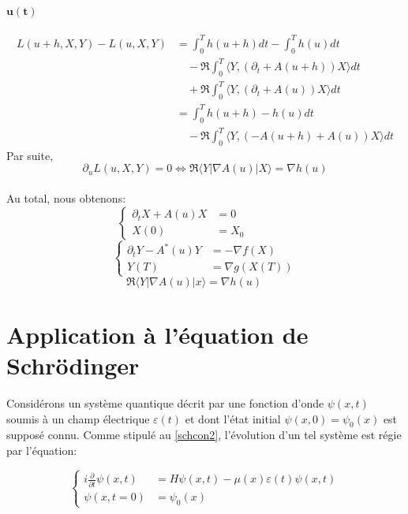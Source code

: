 \paragraph*{$\mathbf{u(t)}$}
\begin{align*}
L(u+h,X,Y) - L(u,X,Y) &= \int_{0}^{T}h(u+h)dt - \int_{0}^{T}h(u)dt\\
&\quad -\Re \int_{0}^{T}\langle Y,(\partial_{t}+A(u+h))X \rangle dt\\
&\quad +\Re \int_{0}^{T}\langle Y,(\partial_{t}+A(u))X \rangle dt\\
&= \int_{0}^{T}h(u+h)-h(u)dt\\
&\quad -\Re \int_{0}^{T}\langle Y,(-A(u+h)+A(u))X \rangle dt
\end{align*}
Par suite, 
\begin{equation}
\partial_{u} L(u,X,Y)=0 \iff \Re \langle Y|\nabla A(u)|X \rangle = \nabla h(u)
\end{equation}
\\Au total, nous obtenons:
\begin{equation}
\begin{cases}
\partial_{t}X +A(u)X &= 0\\
X(0) &=X_0\quad\quad\quad\quad
\end{cases}
\end{equation}
\begin{equation}
\begin{cases}
\partial_{t}Y -A^{*}(u)Y &= -\nabla f(X)\\
Y(T) &=\nabla g(X(T))
\end{cases}
\end{equation}
\begin{equation}
\Re \langle Y|\nabla A(u)|x \rangle = \nabla h(u) \quad\quad
\end{equation}
\section{Application à l'équation de Schrödinger}

Considérons un système quantique décrit par une fonction d’onde $\psi(x, t)$ soumis à un champ électrique $\varepsilon(t)$ et dont l’état initial $\psi(x, 0) = \psi_0 (x)$ est supposé connu. Comme stipulé au \eqref{schcon2}, l’évolution d’un tel système est régie par l’équation:

\begin{equation}
\begin{cases}
i \frac{\partial}{\partial t} \psi (x,t) &= H\psi(x,t) - \mu(x)\varepsilon(t)\psi(x,t)\\
\psi(x,t=0) &=\psi_0(x)
\end{cases}
\end{equation}

